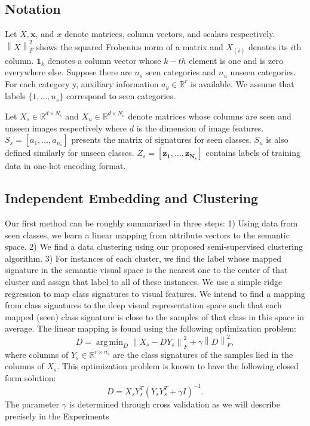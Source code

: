 \documentclass[letterpaper]{article}
\newcommand{\norm}[1]{\left \lVert #1 \right \rVert_{F}^2}
\DeclareMathOperator*{\argmin}{arg\,min}
\begin{document}
\subsection{Notation}
Let $X, \mathbf{x}$, and $x$ denote matrices, column vectors, and scalars respectively. $\norm{X}$ shows the squared Frobenius norm of a matrix and
$X_{(i)}$ denotes its $i$th column. $\mathbf{1}_k$ denotes a column vector whose $k-th$ element is one and is zero everywhere else.
Suppose there are $n_s$ seen categories and $n_u$ unseen categories. For each category y,
auxiliary information $a_y \in \mathbb{R}^r$ is available. We assume that labels $\{1, \ldots, n_s \}$ correspond to seen categories.

Let $X_s \in \mathbb{R}^{d \times N_s}$ and $X_u \in \mathbb{R}^{d \times N_u}$
denote matrices whose columns are seen and unseen images respectively where $d$ is the dimension of image features.
$S_s = [a_1, \ldots, a_{n_s}]$ presents the matrix of signatures for seen classes. $S_u$ is also defined similarly for unseen classes.
$Z_s = [ \mathbf{z_1}, \ldots, \mathbf{z_{N_s}} ]$
contains labels of training data in one-hot encoding format.

\subsection{Independent Embedding and Clustering} \label{clustering}
Our first method can be roughly summarized in three steps:
  1) Using data from seen classes, we learn a linear mapping from attribute vectors to the semantic space.
  2) We find a data clustering using our proposed semi-supervised clustering algorithm.
  3) For instances of each cluster, we find the label whose mapped signature in the semantic visual space is the nearest one to the center of that cluster and assign that label to all of these instances.
We use a simple ridge regression to map class signatures to visual features. We intend to find a mapping from class signatures
 to the deep visual representation space such that each mapped (seen) class signature is close to the samples of that class in this space in average.
The linear mapping is found using the following optimization problem:
\begin{equation} \label{eq:mapping}
  D = \argmin_D \norm{X_s - D Y_s} + \gamma \norm{D},
\end{equation}
where columns of $ Y_s \in \mathbb{R}^{r \times n_s} $ are the class signatures of the samples lied in the columns of $X_s$.
This optimization problem is known to have the following closed form solution:
\begin{equation} \label{eq:dic}
  D = X_s Y_s^T (Y_s Y_s^T + \gamma I)^{-1}.
\end{equation}
The parameter $\gamma$ is determined through cross validation as we will describe precisely in the Experiments
\end{document}
